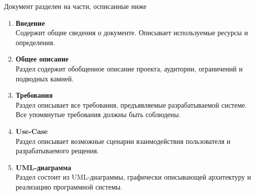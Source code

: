 
Документ разделен на части, осписанные ниже
\begin{enumerate}
      \item \textbf{Введение} \\
            Содержит общие сведения о документе. Описывает
            используемые ресурсы и определения.

      \item \textbf{Общее описание} \\
            Раздел содержит обобщенное описание проекта,
            аудитории, ограничений и подводных камней.

      \item \textbf{Требования} \\
            Раздел описывает все требования, предъявляемые
            разрабатываемой системе. Все упомянутые требования
            должны быть соблюдены.

      \item \textbf{Use-Case} \\
            Раздел описывает возможные сценарии взаимодействия
            пользователя и разрабатываемого рещения.

      \item \textbf{UML-диаграмма} \\
            Раздел состоит из UML-диаграммы, графически
            описывающей архитектуру и реализацию программной
            системы.
\end{enumerate}
